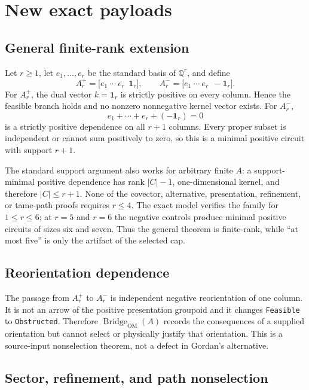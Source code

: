 \documentclass[11pt]{article}
\newcommand{\Q}{\mathbb{Q}}
\newcommand{\Bridge}{\operatorname{Bridge}_{\mathrm{OM}}}
\begin{document}
\section{New exact payloads}

\subsection{General finite-rank extension}

Let $r\ge1$, let $e_1,\ldots,e_r$ be the standard basis of $\Q^r$, and define
\[
 A_r^+=\bigl[e_1\ \cdots\ e_r\ \ \mathbf{1}_r\bigr],\qquad
 A_r^-=\bigl[e_1\ \cdots\ e_r\ \ -\mathbf{1}_r\bigr].
\]
For $A_r^+$, the dual vector $k=\mathbf{1}_r$ is strictly positive on every
column.  Hence the feasible branch holds and no nonzero nonnegative kernel
vector exists.  For $A_r^-$,
\[
 e_1+\cdots+e_r+(-\mathbf{1}_r)=0
\]
is a strictly positive dependence on all $r+1$ columns.  Every proper subset
is independent or cannot sum positively to zero, so this is a minimal positive
circuit with support $r+1$.

The standard support argument also works for arbitrary finite $A$: a
support-minimal positive dependence has rank $|C|-1$, one-dimensional kernel,
and therefore $|C|\le r+1$.  None of the covector, alternative,
presentation, refinement, or tame-path proofs requires $r\le4$.  The exact
model verifies the family for $1\le r\le6$; at $r=5$ and $r=6$ the negative
controls produce minimal positive circuits of sizes six and seven.  Thus the
general theorem is finite-rank, while ``at most five'' is only the artifact of
the selected cap.

\subsection{Reorientation dependence}

The passage from $A_r^+$ to $A_r^-$ is independent negative reorientation of
one column.  It is not an arrow of the positive presentation groupoid and it
changes \texttt{Feasible} to \texttt{Obstructed}.  Therefore
$\Bridge(A)$ records the consequences of a supplied orientation but cannot
select or physically justify that orientation.  This is a source-input
nonselection theorem, not a defect in Gordan's alternative.

\subsection{Sector, refinement, and path nonselection}
\end{document}
